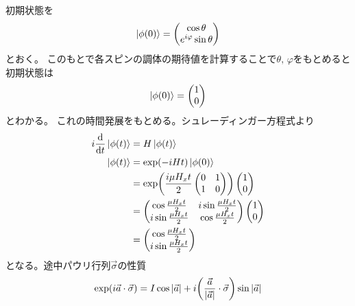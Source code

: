 \documentclass[../../master.tex]{subfiles}
\begin{document}
\subsection{}
初期状態を
\begin{align}
    \ket{\phi(0)} = \begin{pmatrix}
        \cos\theta\\
        e^{i\varphi}\sin\theta
    \end{pmatrix}
\end{align}
とおく。
このもとで各スピンの調体の期待値を計算することで\(\theta,\,\varphi\)をもとめると
初期状態は
\begin{align}
    \ket{\phi(0)}=\begin{pmatrix}
        1\\0
    \end{pmatrix}
\end{align}
とわかる。
これの時間発展をもとめる。シュレーディンガー方程式より
\begin{align}
    i\dv{t} \ket{\phi(t)} &= H\ket{\phi(t)}\\
    \ket{\phi(t)}&=\exp(-iHt)\ket{\phi(0)}\\
    &=\exp(\frac{i\mu H_x t}{2}\begin{pmatrix}
        0 & 1\\
        1 & 0
    \end{pmatrix})\begin{pmatrix}
        1\\0
    \end{pmatrix}\\
    &=\begin{pmatrix}
        \cos\frac{\mu H_x t}{2}& i\sin\frac{\mu H_x t}{2}\\
        i\sin\frac{\mu H_x t}{2} & \cos\frac{\mu H_x t}{2}
    \end{pmatrix}\begin{pmatrix}
        1 \\0
    \end{pmatrix}\\
    &=\begin{pmatrix}
        \cos\frac{\mu H_x t}{2}\\
        i\sin\frac{\mu H_x t}{2}
    \end{pmatrix}
\end{align}
となる。途中パウリ行列\(\vec{\sigma}\)の性質
\begin{align}
    \exp(i\vec{a}\cdot\vec{\sigma})
    =I\cos\abs{\vec{a}}
    +i\qty(\frac{\vec{a}}{\abs{\vec{a}}}\cdot\vec{\sigma})\sin\abs{\vec{a}}
\end{align}
\end{document}
